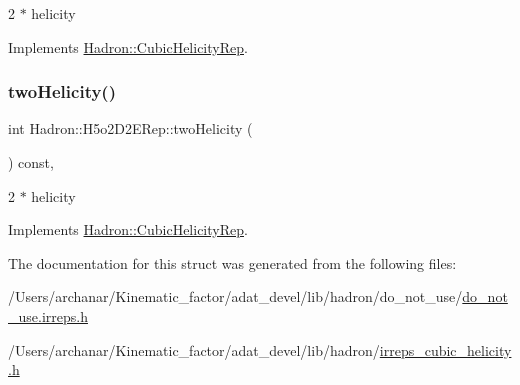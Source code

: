 2 $\ast$ helicity 

Implements \mbox{\hyperlink{structHadron_1_1CubicHelicityRep_af507aa56fc2747eacc8cb6c96db31ecc}{Hadron\+::\+Cubic\+Helicity\+Rep}}.

\mbox{\label{structHadron_1_1H5o2D2ERep_a8a929124bb0b88a9f8c8c8a04e633baa}} 
\subsubsection{\texorpdfstring{twoHelicity()}{twoHelicity()}\hspace{0.1cm}{\footnotesize\ttfamily [2/2]}}
{\footnotesize\ttfamily int Hadron\+::\+H5o2\+D2\+E\+Rep\+::two\+Helicity (\begin{DoxyParamCaption}{ }\end{DoxyParamCaption}) const\hspace{0.3cm}{\ttfamily [inline]}, {\ttfamily [virtual]}}

2 $\ast$ helicity 

Implements \mbox{\hyperlink{structHadron_1_1CubicHelicityRep_af507aa56fc2747eacc8cb6c96db31ecc}{Hadron\+::\+Cubic\+Helicity\+Rep}}.



The documentation for this struct was generated from the following files\+:\begin{DoxyCompactItemize}
\item 
/\+Users/archanar/\+Kinematic\+\_\+factor/adat\+\_\+devel/lib/hadron/do\+\_\+not\+\_\+use/\mbox{\hyperlink{do__not__use_8irreps_8h}{do\+\_\+not\+\_\+use.\+irreps.\+h}}\item 
/\+Users/archanar/\+Kinematic\+\_\+factor/adat\+\_\+devel/lib/hadron/\mbox{\hyperlink{lib_2hadron_2irreps__cubic__helicity_8h}{irreps\+\_\+cubic\+\_\+helicity.\+h}}\end{DoxyCompactItemize}
